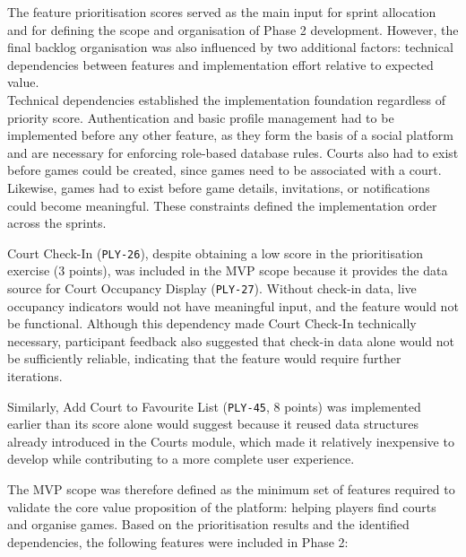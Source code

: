 The feature prioritisation scores served as the main input for sprint allocation and for defining the scope and organisation of Phase 2 development. 
However, the final backlog organisation was also influenced by two additional factors: technical dependencies between features and implementation effort relative to expected value.\\

Technical dependencies established the implementation foundation regardless of priority score. Authentication and basic profile management had to be implemented before any other feature, as they form the basis of a social platform and are necessary for enforcing role-based database rules.
Courts also had to exist before games could be created, since games need to be associated with a court. Likewise, games had to exist before game details, invitations, or notifications could become meaningful. 
These constraints defined the implementation order across the sprints.

Court Check-In (\texttt{PLY-26}), despite obtaining a low score in the prioritisation exercise (3 points), was included in the MVP scope because it provides the data source for Court Occupancy Display (\texttt{PLY-27}).
Without check-in data, live occupancy indicators would not have meaningful input, and the feature would not be functional.
Although this dependency made Court Check-In technically necessary, participant feedback also suggested that check-in data alone would not be sufficiently reliable, indicating that the feature would require further iterations.

Similarly, Add Court to Favourite List (\texttt{PLY-45}, 8 points) was implemented earlier than its score alone would suggest because it reused data structures already introduced in the Courts module, which made it relatively inexpensive to develop while contributing to a more complete user experience.

The MVP scope was therefore defined as the minimum set of features required to validate the core value proposition of the platform: helping players find courts and organise games. Based on the prioritisation results and the identified dependencies, the following features were included in Phase 2:

